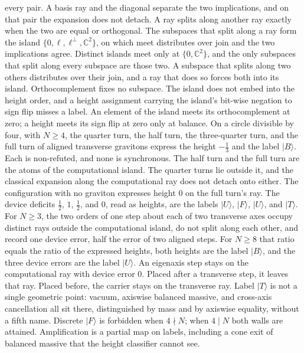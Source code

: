 \documentclass[a4paper]{article}
\theoremstyle{definition}
\begin{document}
every pair. A basis ray and the diagonal separate the two implications,
and on that pair the expansion does not detach. A ray splits along
another ray exactly when the two are equal or orthogonal. The subspaces
that split along a ray form the island
\(\{0,\ell,\ell^\perp,\mathbb{C}^2\}\), on which meet distributes over
join and the two implications agree. Distinct islands meet only at
\(\{0,\mathbb{C}^2\}\), and the only subspaces that split along every
subspace are those two. A subspace that splits along two others
distributes over their join, and a ray that does so forces both into
its island. Orthocomplement fixes no subspace. The island does not
embed into the height order, and a height assignment carrying the
island's bit-wise negation to sign flip misses a label. An element of
the island meets its orthocomplement at zero; a height meets its sign
flip at zero only at balance. On a circle divisible by four, with
\(N\ge 4\), the quarter turn, the half turn, the three-quarter turn,
and the full turn of aligned transverse gravitons express the height
\(-\frac13\) and the label \(\lvert B\rangle\). Each is non-refuted,
and none is synchronous. The half turn and the full turn are the atoms
of the computational island. The quarter turns lie outside it, and the
classical expansion along the computational ray does not detach onto
either. The configuration with no graviton expresses height \(0\) on
the full turn's ray. The
device deficits \(\frac12\), \(1\), \(\frac12\), and \(0\), read as
heights, are the labels \(\lvert U\rangle\), \(\lvert F\rangle\),
\(\lvert U\rangle\), and \(\lvert T\rangle\). For \(N\ge 3\), the two
orders of one step about each of two transverse axes occupy distinct
rays outside the computational island, do not split along each other,
and record one device error, half the error of two aligned steps. For
\(N\ge 8\) that ratio equals the ratio of the expressed heights, both
heights are the label \(\lvert B\rangle\), and the three device errors
are the label \(\lvert U\rangle\). An eigenaxis step stays on the
computational ray with device error \(0\). Placed after a transverse
step, it leaves that ray. Placed before, the carrier stays on the
transverse ray. Label \(\lvert T\rangle\) is not a
single geometric point: vacuum, axiswise balanced massive, and
cross-axis cancellation all sit there, distinguished by mass and by
axiswise equality, without a fifth name. Discrete \(\lvert F\rangle\)
is forbidden when \(4\nmid N\); when \(4\mid N\) both walls are
attained. Amplification is a partial map on labels, including a cone
exit of balanced massive that the height classifier cannot see.
\end{document}
